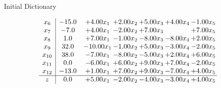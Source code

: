 \documentclass[8pt]{article}
\begin{document}
Initial Dictionary 

\[\begin{array}{c| c c@{\hskip 2pt} c@{\hskip 2pt} c@{\hskip 2pt} c@{\hskip 2pt} c@{\hskip 2pt} }
 x_{6}   &  -15.0 & +  4.00 x_{1} & +  2.00 x_{2} & +  5.00 x_{3} & +  4.00 x_{4} & -1.00 x_{5}\\
 x_{7}   &  -7.0 & +  4.00 x_{1} & -2.00 x_{2} & +  7.00 x_{3} &   & +  7.00 x_{5}\\
 x_{8}   &  1.0 & +  7.00 x_{1} & -1.00 x_{2} & -8.00 x_{3} & -8.00 x_{4} & +  2.00 x_{5}\\
 x_{9}   &  32.0 & -10.00 x_{1} & -1.00 x_{2} & +  5.00 x_{3} & -3.00 x_{4} & -2.00 x_{5}\\
 x_{10}   &  38.0 & -7.00 x_{1} & -8.00 x_{2} & -5.00 x_{3} & +  2.00 x_{4} & +  6.00 x_{5}\\
 x_{11}   &  0.0 & -6.00 x_{1} & +  6.00 x_{2} & +  9.00 x_{3} & +  7.00 x_{4} & -2.00 x_{5}\\
 x_{12}   &  -13.0 & +  1.00 x_{1} & +  7.00 x_{2} & +  9.00 x_{3} & -7.00 x_{4} & +  4.00 x_{5}\\
\hline
z    &  0.0 & +  5.00 x_{1} & -2.00 x_{2} & -4.00 x_{3} & -3.00 x_{4} & +  4.00 x_{5}\\
\end{array}\]
\end{document}
